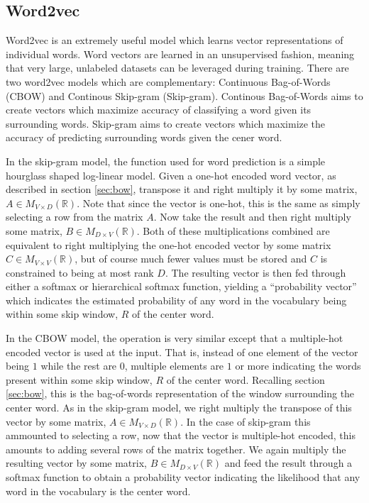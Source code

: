 \subsection{Word2vec}
Word2vec \cite{tm13_og} is an extremely useful model which learns vector representations of individual words.  Word vectors are learned in an unsupervised fashion, meaning that very large, unlabeled datasets can be leveraged during training.  There are two word2vec models which are complementary:  Continuous Bag-of-Words (CBOW) and Continous Skip-gram (Skip-gram).  Continous Bag-of-Words aims to create vectors which maximize accuracy of classifying a word given its surrounding words.  Skip-gram aims to create vectors which maximize the accuracy of predicting surrounding words given the cener word.

In the skip-gram model, the function used for word prediction is a simple hourglass shaped log-linear model.  Given a one-hot encoded word vector, as described in section \ref{sec:bow}, transpose it and right multiply it by some matrix, $A \in M_{V\times D}(\mathbb{R})$.  Note that since the vector is one-hot, this is the same as simply selecting a row from the matrix $A$.  Now take the result and then right multiply some matrix, $B \in M_{D\times V}(\mathbb{R})$.  Both of these multiplications combined are equivalent to right multiplying the one-hot encoded vector by some matrix $C \in M_{V\times V}(\mathbb{R})$, but of course much fewer values must be stored and $C$ is constrained to being at most rank $D$.  The resulting vector is then fed through either a softmax or hierarchical softmax function, yielding a ``probability vector'' which indicates the estimated probability of any word in the vocabulary being within some skip window, $R$ of the center word.

In the CBOW model, the operation is very similar except that a multiple-hot encoded vector is used at the input.  That is, instead of one element of the vector being $1$ while the rest are $0$, multiple elements are $1$ or more indicating the words present within some skip window, $R$ of the center word.  Recalling section \ref{sec:bow}, this is the bag-of-words representation of the window surrounding the center word.  As in the skip-gram model, we right multiply the transpose of this vector by some matrix, $A \in M_{V\times D}(\mathbb{R})$.  In the case of skip-gram this ammounted to selecting a row, now that the vector is multiple-hot encoded, this amounts to adding several rows of the matrix together.  We again multiply the resulting vector by some matrix, $B \in M_{D\times V}(\mathbb{R})$ and feed the result through a softmax function to obtain a probability vector indicating the likelihood that any word in the vocabulary is the center word.

